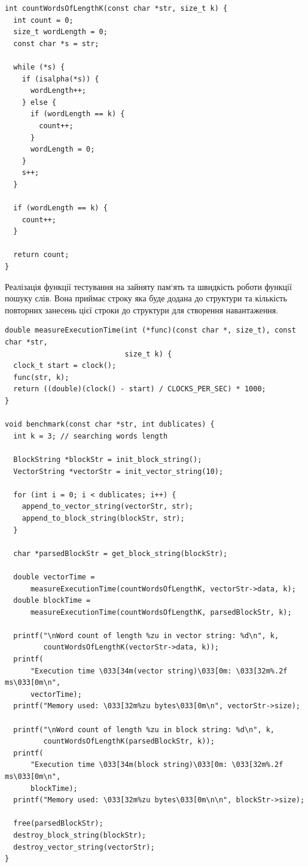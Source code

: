 \begin{lstlisting}[style=customc]
int countWordsOfLengthK(const char *str, size_t k) {
  int count = 0;
  size_t wordLength = 0;
  const char *s = str;

  while (*s) {
    if (isalpha(*s)) {
      wordLength++;
    } else {
      if (wordLength == k) {
        count++;
      }
      wordLength = 0;
    }
    s++;
  }

  if (wordLength == k) {
    count++;
  }

  return count;
}
\end{lstlisting}

Реалізація функції тестування на зайняту пам`ять та швидкість роботи функції пошуку слів.
Вона приймає строку яка буде додана до структури та кількість повторних занесень цієї строки до структури для створення навантаження.

\begin{lstlisting}[style=customc]
double measureExecutionTime(int (*func)(const char *, size_t), const char *str,
                            size_t k) {
  clock_t start = clock();
  func(str, k);
  return ((double)(clock() - start) / CLOCKS_PER_SEC) * 1000;
}

void benchmark(const char *str, int dublicates) {
  int k = 3; // searching words length

  BlockString *blockStr = init_block_string();
  VectorString *vectorStr = init_vector_string(10);

  for (int i = 0; i < dublicates; i++) {
    append_to_vector_string(vectorStr, str);
    append_to_block_string(blockStr, str);
  }

  char *parsedBlockStr = get_block_string(blockStr);

  double vectorTime =
      measureExecutionTime(countWordsOfLengthK, vectorStr->data, k);
  double blockTime =
      measureExecutionTime(countWordsOfLengthK, parsedBlockStr, k);

  printf("\nWord count of length %zu in vector string: %d\n", k,
         countWordsOfLengthK(vectorStr->data, k));
  printf(
      "Execution time \033[34m(vector string)\033[0m: \033[32m%.2f ms\033[0m\n",
      vectorTime);
  printf("Memory used: \033[32m%zu bytes\033[0m\n", vectorStr->size);

  printf("\nWord count of length %zu in block string: %d\n", k,
         countWordsOfLengthK(parsedBlockStr, k));
  printf(
      "Execution time \033[34m(block string)\033[0m: \033[32m%.2f ms\033[0m\n",
      blockTime);
  printf("Memory used: \033[32m%zu bytes\033[0m\n\n", blockStr->size);

  free(parsedBlockStr);
  destroy_block_string(blockStr);
  destroy_vector_string(vectorStr);
}
\end{lstlisting}

